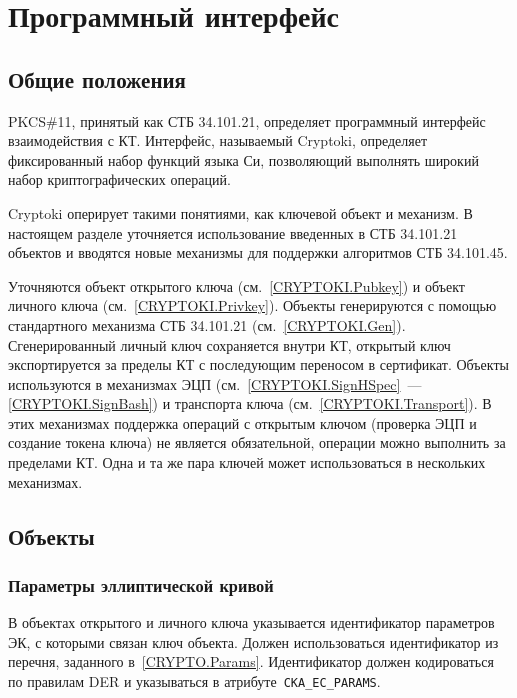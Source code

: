 \chapter{Программный интерфейс}\label{CRYPTOKI}

\section{Общие положения}\label{CRYPTOKI.Common}

PKCS\#11, принятый как СТБ 34.101.21, определяет программный
интерфейс взаимодействия с КТ. Интерфейс, называемый Cryptoki, определяет 
фиксированный набор функций языка Си, позволяющий выполнять широкий набор 
криптографических операций. 

Cryptoki оперирует такими понятиями, как ключевой объект и механизм.
%
В настоящем разделе уточняется использование введенных
в СТБ 34.101.21 объектов и вводятся новые механизмы для поддержки
алгоритмов СТБ 34.101.45.

Уточняются объект открытого ключа (см.~\ref{CRYPTOKI.Pubkey}) и объект
личного ключа (см.~\ref{CRYPTOKI.Privkey}). Объекты генерируются с помощью 
стандартного механизма СТБ 34.101.21 (см.~\ref{CRYPTOKI.Gen}). 
Сгенерированный личный ключ сохраняется внутри КТ, открытый ключ 
экспортируется за пределы КТ с последующим переносом в сертификат. 
Объекты используются в механизмах ЭЦП (см.~\ref{CRYPTOKI.SignHSpec}~--- 
\ref{CRYPTOKI.SignBash}) и транспорта ключа 
(см.~\ref{CRYPTOKI.Transport}).
%
В этих механизмах поддержка операций с открытым ключом (проверка ЭЦП и 
создание токена ключа) не является обязательной, операции можно выполнить 
за пределами КТ. Одна и та же пара ключей может использоваться в 
нескольких механизмах.

\section{Объекты}\label{CRYPTOKI.Obj}

\subsection{Параметры эллиптической кривой}\label{CRYPTOKI.Params}

В объектах открытого и личного ключа указывается 
идентификатор параметров ЭК, с которыми связан ключ объекта.
%
Должен использоваться идентификатор из перечня, заданного 
в~\ref{CRYPTO.Params}.
%
Идентификатор должен кодироваться по правилам DER и указываться в 
атрибуте~\verb|CKA_EC_PARAMS|.

